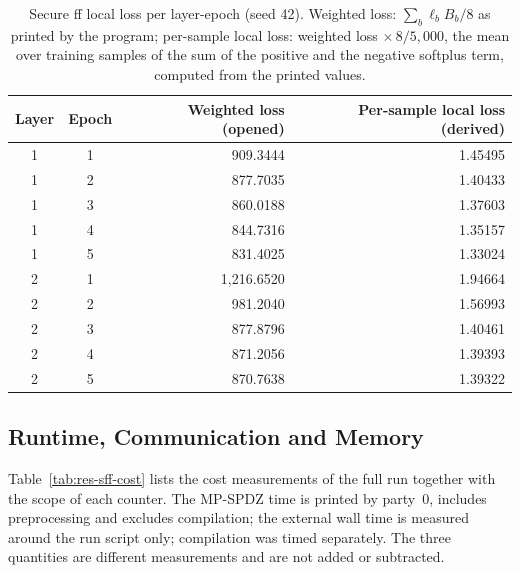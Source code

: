 \begin{table}[htbp]
\centering
\small
\begin{tabular}{@{}ccrr@{}}
\toprule
Layer & Epoch & Weighted loss (opened) & Per-sample local loss (derived) \\
\midrule
1 & 1 & 909.3444 & 1.45495 \\
1 & 2 & 877.7035 & 1.40433 \\
1 & 3 & 860.0188 & 1.37603 \\
1 & 4 & 844.7316 & 1.35157 \\
1 & 5 & 831.4025 & 1.33024 \\
\midrule
2 & 1 & 1{,}216.6520 & 1.94664 \\
2 & 2 & 981.2040 & 1.56993 \\
2 & 3 & 877.8796 & 1.40461 \\
2 & 4 & 871.2056 & 1.39393 \\
2 & 5 & 870.7638 & 1.39322 \\
\bottomrule
\end{tabular}
\caption{Secure \ac{ff} local loss per layer-epoch (seed 42). Weighted loss: $\sum_b\ell_bB_b/8$ as printed by the program; per-sample local loss: weighted loss $\times\,8/5{,}000$, the mean over training samples of the sum of the positive and the negative softplus term, computed from the printed values.}
\label{tab:res-sff-loss}
\end{table}

\FloatBarrier
\subsection{Runtime, Communication and Memory}\label{sec:res-sff-cost}
Table~\ref{tab:res-sff-cost} lists the cost measurements of the full run together with the scope of each counter. The MP-SPDZ time is printed by party~0, includes preprocessing and excludes compilation; the external wall time is measured around the run script only; compilation was timed separately. The three quantities are different measurements and are not added or subtracted.

